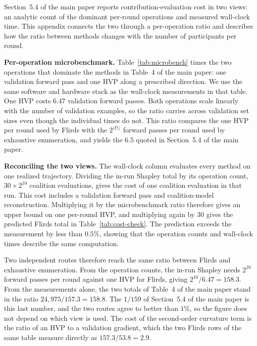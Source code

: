 \documentclass[letterpaper]{article} %
\theoremstyle{definition}
\begin{document}
Section~5.4 of the main paper reports contribution-evaluation cost in two
views: an analytic count of the dominant per-round operations and measured
wall-clock time. This appendix connects the two through a
per-operation ratio
and describes how the ratio between methods changes with the number of
participants per round.

\noindent\textbf{Per-operation microbenchmark.} Table~\ref{tab:microbench} times the two
operations that dominate the methods in Table~4 of the main paper: one
validation forward pass and one HVP along a prescribed direction. We use the same
software and hardware stack as the wall-clock measurements in that table. One
HVP costs $6.47$ validation forward passes. Both operations scale linearly
with the number of validation examples, so the ratio carries across validation
set sizes even though the individual times do not. This ratio compares the one
HVP per round used by Flirds with the $2^{|P_r|}$ forward passes per round used
by exhaustive enumeration, and yields the $6.5$ quoted in
Section~5.4 of the main paper.

\noindent\textbf{Reconciling the two views.} The wall-clock column evaluates every
method on one realized trajectory. Dividing the in-run Shapley total by its
operation count, $30 \times 2^{10}$ coalition evaluations, gives the cost of
one coalition evaluation in that run. This cost includes a validation forward
pass and coalition-model reconstruction. Multiplying it by the microbenchmark
ratio therefore gives an upper bound on one per-round HVP, and multiplying
again by 30 gives the predicted Flirds total in Table~\ref{tab:cost-check}. The
prediction exceeds the measurement by less than $0.5\%$, showing that the
operation counts and wall-clock times describe the same computation.

Two independent routes therefore reach the same ratio between Flirds and
exhaustive enumeration. From the operation counts, the in-run Shapley needs
$2^{10}$ forward passes per round against one HVP for Flirds, giving
$2^{10}/6.47 = 158.3$. From the measurements alone, the two totals of
Table~4 of the main paper stand in the ratio $24{,}975/157.3 = 158.8$. The $1/159$
of Section~5.4 of the main paper is this last number, and the two routes agree to
better than $1\%$, so the figure does not depend on which view is used. The
cost of the second-order curvature term is the ratio of an HVP to a validation
gradient, which the two Flirds rows of the same table measure directly as
$157.3/53.8 = 2.9$.
\end{document}
